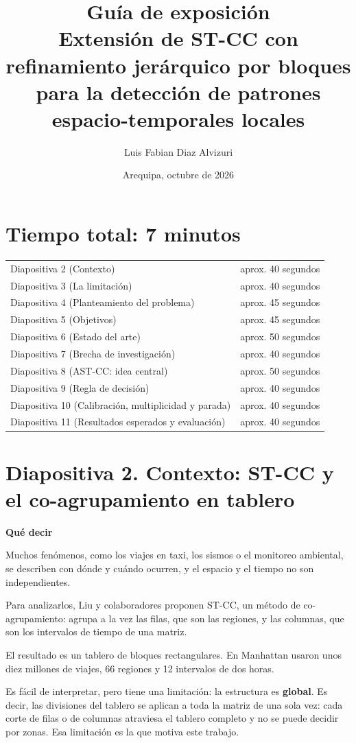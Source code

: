 \documentclass[11pt,a4paper]{article}
\title{\textbf{Guía de exposición}\\[0.5ex]\large Extensión de ST-CC con refinamiento jerárquico por bloques\\para la detección de patrones espacio-temporales locales}
\author{Luis Fabian Diaz Alvizuri}
\date{Arequipa, octubre de 2026}
\newcommand{\cajainicio}[3]{\par\medskip\noindent
  \begin{lrbox}{\cajabox}\begin{minipage}{\dimexpr\linewidth-2\fboxsep-2\fboxrule\relax}%
  \textbf{\color{#1}#3}\par\smallskip}
\newcommand{\cajafin}[2]{\end{minipage}\end{lrbox}\fcolorbox{#1}{#2}{\usebox{\cajabox}}\par\medskip}
\newenvironment{guion}{\cajainicio{ucspblue}{ucspblue!6}{Qué decir}}{\cajafin{ucspblue}{ucspblue!6}}
\newcommand{\STCC}{ST-CC}
\begin{document}
\maketitle

\section*{Tiempo total: 7 minutos}

\begin{center}
\begin{tabular}{@{}ll@{}}
Diapositiva 2 (Contexto) & aprox. 40 segundos\\
Diapositiva 3 (La limitación) & aprox. 40 segundos\\
Diapositiva 4 (Planteamiento del problema) & aprox. 45 segundos\\
Diapositiva 5 (Objetivos) & aprox. 45 segundos\\
Diapositiva 6 (Estado del arte) & aprox. 50 segundos\\
Diapositiva 7 (Brecha de investigación) & aprox. 40 segundos\\
Diapositiva 8 (AST-CC: idea central) & aprox. 50 segundos\\
Diapositiva 9 (Regla de decisión) & aprox. 40 segundos\\
Diapositiva 10 (Calibración, multiplicidad y parada) & aprox. 40 segundos\\
Diapositiva 11 (Resultados esperados y evaluación) & aprox. 40 segundos\\
\end{tabular}
\end{center}

\section*{Diapositiva 2. Contexto: ST-CC y el co-agrupamiento en tablero}

\begin{guion}
Muchos fenómenos, como los viajes en taxi, los sismos o el monitoreo ambiental, se describen con dónde y cuándo ocurren, y el espacio y el tiempo no son independientes.

Para analizarlos, Liu y colaboradores proponen \STCC, un método de co-agrupamiento: agrupa a la vez las filas, que son las regiones, y las columnas, que son los intervalos de tiempo de una matriz.

El resultado es un tablero de bloques rectangulares. En Manhattan usaron unos diez millones de viajes, 66 regiones y 12 intervalos de dos horas.

Es fácil de interpretar, pero tiene una limitación: la estructura es \textbf{global}. Es decir, las divisiones del tablero se aplican a toda la matriz de una sola vez: cada corte de filas o de columnas atraviesa el tablero completo y no se puede decidir por zonas. Esa limitación es la que motiva este trabajo.
\end{guion}
\end{document}
